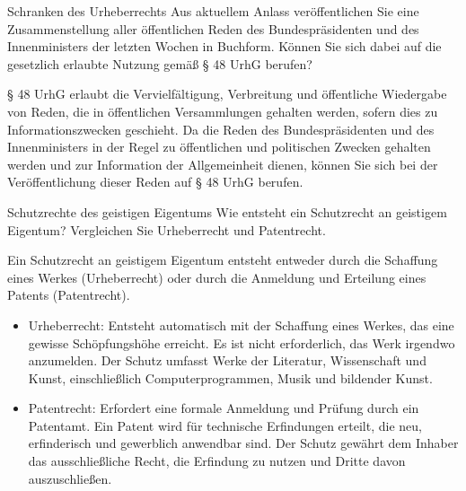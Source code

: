 \documentclass{article}
\begin{document}
\begin{exercise}{Schranken des Urheberrechts}
  Aus aktuellem Anlass veröffentlichen Sie eine Zusammenstellung aller öffentlichen Reden des Bundespräsidenten und des Innenministers der letzten Wochen in Buchform. Können Sie sich dabei auf die gesetzlich erlaubte Nutzung gemäß § 48 UrhG berufen?

  \begin{solution}
    § 48 UrhG erlaubt die Vervielfältigung, Verbreitung und öffentliche Wiedergabe von Reden, die in öffentlichen Versammlungen gehalten werden, sofern dies zu Informationszwecken geschieht. Da die Reden des Bundespräsidenten und des Innenministers in der Regel zu öffentlichen und politischen Zwecken gehalten werden und zur Information der Allgemeinheit dienen, können Sie sich bei der Veröffentlichung dieser Reden auf § 48 UrhG berufen.
  \end{solution}
\end{exercise}

\begin{exercise}{Schutzrechte des geistigen Eigentums}
  Wie entsteht ein Schutzrecht an geistigem Eigentum? Vergleichen Sie Urheberrecht und Patentrecht.

  \begin{solution}
    Ein Schutzrecht an geistigem Eigentum entsteht entweder durch die Schaffung eines Werkes (Urheberrecht) oder durch die Anmeldung und Erteilung eines Patents (Patentrecht).
    \begin{itemize}
      \item Urheberrecht: Entsteht automatisch mit der Schaffung eines Werkes, das eine gewisse Schöpfungshöhe erreicht. Es ist nicht erforderlich, das Werk irgendwo anzumelden. Der Schutz umfasst Werke der Literatur, Wissenschaft und Kunst, einschließlich Computerprogrammen, Musik und bildender Kunst.
      \item Patentrecht: Erfordert eine formale Anmeldung und Prüfung durch ein Patentamt. Ein Patent wird für technische Erfindungen erteilt, die neu, erfinderisch und gewerblich anwendbar sind. Der Schutz gewährt dem Inhaber das ausschließliche Recht, die Erfindung zu nutzen und Dritte davon auszuschließen.
    \end{itemize}
  \end{solution}
\end{exercise}
\end{document}
